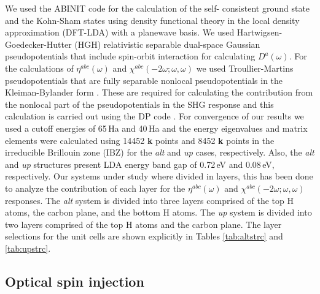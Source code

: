 \documentclass[pss]{wiley2sp} %
\begin{document}
We used the ABINIT code \cite{gonzeCPC09} for the calculation of the self-
consistent ground state and the Kohn-Sham states using density functional
theory in the local density approximation (DFT-LDA) with a planewave basis. We
used Hartwigsen-Goedecker-Hutter (HGH) relativistic separable dual-space
Gaussian pseudopotentials \cite{hartwigsenPRB98} that include spin-orbit
interaction for calculating $D^{a}(\omega)$. For the calculations of
{$\eta^{abc}(\omega)$} and $\chi^{abc}(-2\omega;\omega,\omega)$ we used
Troullier-Martins pseudopotentials \cite{troullierPRB91} that are fully
separable nonlocal pseudopotentials in the Kleiman-Bylander form
\cite{kleinmanPRL82}. These are required for calculating the contribution from
the nonlocal part of the pseudopotentials in the SHG response and this
calculation is carried out using the DP code \cite{olevanoDP}. For convergence
of our results we used a cutoff energies of 65\,Ha and 40\,Ha and the energy
eigenvalues and matrix elements were calculated using 14452 \textbf{k} points
and 8452 \textbf{k} points in the irreducible Brillouin zone (IBZ) for the
\emph{alt} and \emph{up} cases, respectively. Also, the \emph{alt} and
\emph{up} structures present LDA energy band gap of  0.72\,eV and 0.08\,eV,
respectively. Our systems under study where divided in layers, this has been
done to analyze the contribution of each layer for the $\eta^{abc}(\omega)$
and $\chi^{abc}(-2\omega;\omega,\omega)$ responses. The \emph{alt} system is
divided into three layers comprised of the top H atoms, the carbon plane, and
the bottom H atoms. The \emph{up} system is divided into two layers comprised
of the top H atoms and the carbon plane. The layer selections for the unit
cells are shown explicitly in Tables \ref{tab:altstrc} and \ref{tab:upstrc}.


\subsection{Optical spin injection}\label{subsec:results-DSP}
\end{document}
